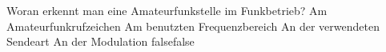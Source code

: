     {Woran erkennt man eine Amateurfunkstelle im Funkbetrieb?}
    {Am Amateurfunkrufzeichen}
    {Am benutzten Frequenzbereich}
    {An der verwendeten Sendeart}
    {An der Modulation}
    {false}{false}